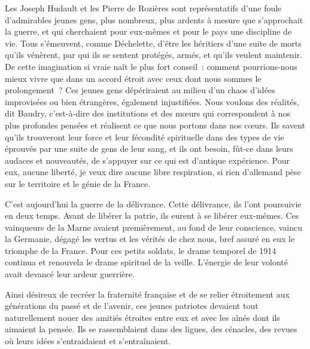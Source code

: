 \documentclass[french,twoside]{book} %
\begin{document}
\noindent Les Joseph Hudault et les Pierre de Rozières sont représentatifs d’une foule d’admirables jeunes gens, plus nombreux, plus ardents à mesure que s’approchait la guerre, et qui cherchaient pour eux-mêmes et pour le pays une discipline de vie. Tous s’émeuvent, comme Déchelette, d’être les héritiers d’une suite de morts qu’ils vénèrent, par qui ils se sentent protégés, armés, et qu’ils veulent maintenir. De cette imagination si vraie naît le plus fort conseil : comment pourrions-nous mieux vivre que dans un accord étroit avec ceux dont nous sommes le prolongement ? Ces jeunes gens dépériraient au milieu d’un chaos d’idées improvisées ou bien étrangères, également injustifiées. Nous voulons des réalités, dit Baudry, c’est-à-dire des institutions et des mœurs qui correspondent à nos plus profondes pensées et réalisent ce que nous portons dans nos cœurs. Ils savent qu’ils trouveront leur force et leur fécondité spirituelle dans des types de vie éprouvés par une suite de gens de leur sang, et ils ont besoin, fût-ce dans leurs audaces et nouveautés, de s’appuyer sur ce qui est d’antique expérience. Pour eux, aucune liberté, je veux dire aucune libre respiration, si rien d’allemand pèse sur le territoire et le génie de la France.‌\par
C’est aujourd’hui la guerre de la délivrance. Cette délivrance, ils l’ont poursuivie en deux temps. Avant de libérer la patrie, ils eurent à se libérer eux-mêmes. Ces vainqueurs de la Marne avaient premièrement, au fond de leur conscience, vaincu la Germanie, dégagé les vertus et les vérités de chez nous, bref assuré en eux le triomphe de la France. Pour ces petits soldats, le drame temporel de 1914 continua et renouvela le drame spirituel de la veille. L’énergie de leur volonté avait devancé leur ardeur guerrière.‌\par
Ainsi désireux de recréer la fraternité française et de se relier étroitement aux générations du passé et de l’avenir, ces jeunes patriotes devaient tout naturellement nouer des amitiés étroites entre eux et avec les aînés dont ils aimaient la pensée. Ils se rassemblaient dans des ligues, des cénacles, des revues où leurs idées s’entraidaient et s’entraînaient.‌\par
\end{document}
